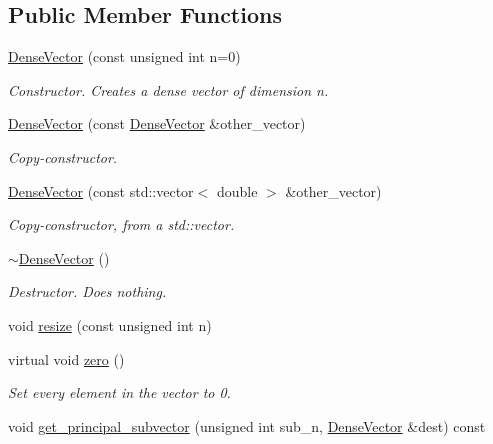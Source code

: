 \subsection*{Public Member Functions}
\begin{DoxyCompactItemize}
\item 
\mbox{\hyperlink{classfemus_1_1_dense_vector_a9ea4283bc84797b07197c41b6796f03c}{Dense\+Vector}} (const unsigned int n=0)
\begin{DoxyCompactList}\small\item\em Constructor. Creates a dense vector of dimension {\ttfamily n}. \end{DoxyCompactList}\item 
\mbox{\hyperlink{classfemus_1_1_dense_vector_a3fee62a53c3ae44b869b8ff1847a737d}{Dense\+Vector}} (const \mbox{\hyperlink{classfemus_1_1_dense_vector}{Dense\+Vector}} \&other\+\_\+vector)
\begin{DoxyCompactList}\small\item\em Copy-\/constructor. \end{DoxyCompactList}\item 
\mbox{\hyperlink{classfemus_1_1_dense_vector_adafc5ed121a642cc307bcd04c4366463}{Dense\+Vector}} (const std\+::vector$<$ double $>$ \&other\+\_\+vector)
\begin{DoxyCompactList}\small\item\em Copy-\/constructor, from a {\ttfamily std\+::vector}. \end{DoxyCompactList}\item 
\mbox{\hyperlink{classfemus_1_1_dense_vector_a55372dde4d08ffd064059d4092eb95fc}{$\sim$\+Dense\+Vector}} ()
\begin{DoxyCompactList}\small\item\em Destructor. Does nothing. \end{DoxyCompactList}\item 
void \mbox{\hyperlink{classfemus_1_1_dense_vector_ae03eb37317154976971332f89dd56352}{resize}} (const unsigned int n)
\item 
virtual void \mbox{\hyperlink{classfemus_1_1_dense_vector_ae2eafd9df7f6ae8fe75165a3eb675a4b}{zero}} ()
\begin{DoxyCompactList}\small\item\em Set every element in the vector to 0. \end{DoxyCompactList}\item 
void \mbox{\hyperlink{classfemus_1_1_dense_vector_aaeb514b12b7b549430fd7264a6f21742}{get\+\_\+principal\+\_\+subvector}} (unsigned int sub\+\_\+n, \mbox{\hyperlink{classfemus_1_1_dense_vector}{Dense\+Vector}} \&dest) const

\end{DoxyCompactItemize}
